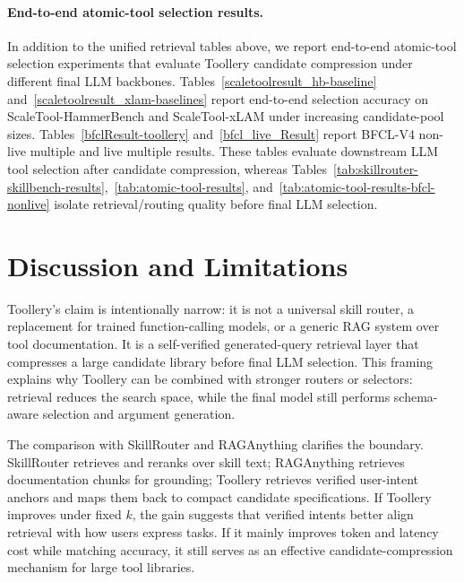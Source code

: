 \documentclass[11pt]{article}
\begin{document}
\paragraph{End-to-end atomic-tool selection results.}
In addition to the unified retrieval tables above, we report end-to-end atomic-tool selection experiments that evaluate Toollery candidate compression under different final LLM backbones. Tables~\ref{scaletoolresult_hb-baseline} and~\ref{scaletoolresult_xlam-baselines} report end-to-end selection accuracy on ScaleTool-HammerBench and ScaleTool-xLAM under increasing candidate-pool sizes. Tables~\ref{bfclResult-toollery} and~\ref{bfcl_live_Result} report BFCL-V4 non-live multiple and live multiple results. These tables evaluate downstream LLM tool selection after candidate compression, whereas Tables~\ref{tab:skillrouter-skillbench-results},~\ref{tab:atomic-tool-results}, and~\ref{tab:atomic-tool-results-bfcl-nonlive} isolate retrieval/routing quality before final LLM selection.






\section{Discussion and Limitations}
\label{sec:discussion_limitations}

Toollery's claim is intentionally narrow: it is not a universal skill router, a replacement for trained function-calling models, or a generic RAG system over tool documentation. It is a self-verified generated-query retrieval layer that compresses a large candidate library before final LLM selection. This framing explains why Toollery can be combined with stronger routers or selectors: retrieval reduces the search space, while the final model still performs schema-aware selection and argument generation.

The comparison with SkillRouter and RAGAnything clarifies the boundary. SkillRouter retrieves and reranks over skill text; RAGAnything retrieves documentation chunks for grounding; Toollery retrieves verified user-intent anchors and maps them back to compact candidate specifications. If Toollery improves under fixed $k$, the gain suggests that verified intents better align retrieval with how users express tasks. If it mainly improves token and latency cost while matching accuracy, it still serves as an effective candidate-compression mechanism for large tool libraries.
\end{document}
